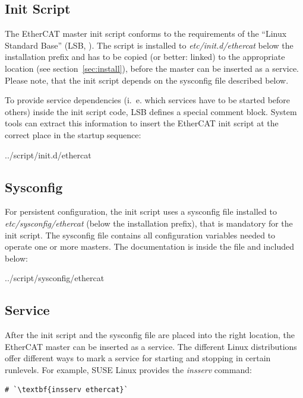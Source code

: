 \documentclass[a4paper,12pt,BCOR6mm,bibtotoc,idxtotoc]{scrbook}
\begin{document}
\subsection{Init Script}
\label{sec:init}

The EtherCAT master init script conforms to the requirements of the ``Linux
Standard Base'' (LSB, \cite{lsb}). The script is installed to
\textit{etc/init.d/ethercat} below the installation prefix and has to be copied
(or better: linked) to the appropriate location (see
section~\ref{sec:install}), before the master can be inserted as a service.
Please note, that the init script depends on the sysconfig file described
below.

To provide service dependencies (i.~e. which services have to be started before
others) inside the init script code, LSB defines a special comment block.
System tools can extract this information to insert the EtherCAT init script at
the correct place in the startup sequence:


    {../script/init.d/ethercat}

\subsection{Sysconfig}
\label{sec:sysconfig}

For persistent configuration, the init script uses a sysconfig file installed
to \textit{etc/sysconfig/ethercat} (below the installation prefix), that is
mandatory for the init script. The sysconfig file contains all configuration
variables needed to operate one or more masters. The documentation is inside
the file and included below:


    {../script/sysconfig/ethercat}

\subsection{Service}
\label{sec:service}

After the init script and the sysconfig file are placed into the right
location, the EtherCAT master can be inserted as a service. The different Linux
distributions offer different ways to mark a service for starting and stopping
in certain runlevels. For example, SUSE Linux provides the \textit{insserv}
command:

\begin{lstlisting}
# `\textbf{insserv ethercat}`
\end{lstlisting}
\end{document}
